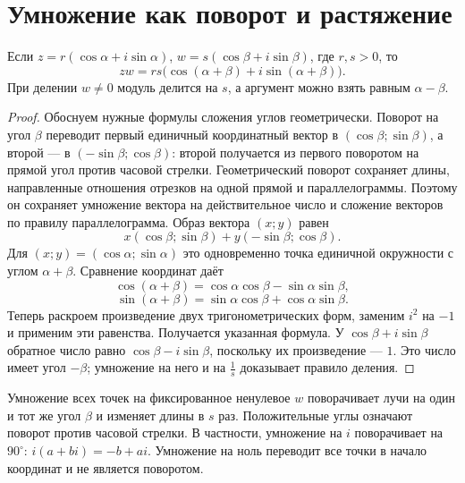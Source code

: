\section{Умножение как поворот и растяжение}
\begin{theorem}\label{thm:legacy-c23-4}
Если \(z=r(\cos\alpha+i\sin\alpha)\), \(w=s(\cos\beta+i\sin\beta)\), где \(r,s>0\), то
\[
zw=rs\bigl(\cos(\alpha+\beta)+i\sin(\alpha+\beta)\bigr).
\]
При делении \(w\ne0\) модуль делится на \(s\), а аргумент можно взять равным \(\alpha-\beta\).
\end{theorem}
\begin{proof}
Обоснуем нужные формулы сложения углов геометрически. Поворот на угол \(\beta\) переводит первый единичный координатный вектор в \((\cos\beta;\sin\beta)\), а второй — в \((-\sin\beta;\cos\beta)\): второй получается из первого поворотом на прямой угол против часовой стрелки. Геометрический поворот сохраняет длины, направленные отношения отрезков на одной прямой и параллелограммы. Поэтому он сохраняет умножение вектора на действительное число и сложение векторов по правилу параллелограмма. Образ вектора \((x;y)\) равен
\[
x(\cos\beta;\sin\beta)+y(-\sin\beta;\cos\beta).
\]
Для \((x;y)=(\cos\alpha;\sin\alpha)\) это одновременно точка единичной окружности с углом \(\alpha+\beta\). Сравнение координат даёт
\[
\cos(\alpha+\beta)=\cos\alpha\cos\beta-\sin\alpha\sin\beta,
\]
\[
\sin(\alpha+\beta)=\sin\alpha\cos\beta+\cos\alpha\sin\beta.
\]
Теперь раскроем произведение двух тригонометрических форм, заменим \(i^2\) на \(-1\) и применим эти равенства. Получается указанная формула. У \(\cos\beta+i\sin\beta\) обратное число равно \(\cos\beta-i\sin\beta\), поскольку их произведение — \(1\). Это число имеет угол \(-\beta\); умножение на него и на \(\frac1s\) доказывает правило деления.
\end{proof}
Умножение всех точек на фиксированное ненулевое \(w\) поворачивает лучи на один и тот же угол \(\beta\) и изменяет длины в \(s\) раз. Положительные углы означают поворот против часовой стрелки. В частности, умножение на \(i\) поворачивает на \(90^\circ\): \(i(a+bi)=-b+ai\). Умножение на ноль переводит все точки в начало координат и не является поворотом.

